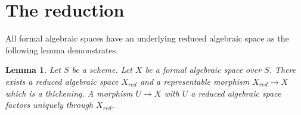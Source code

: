 \documentclass{stacks-project}
\theoremstyle{plain}
\newtheorem{lemma}[subsection]{Lemma}
\theoremstyle{definition}
\theoremstyle{remark}
\numberwithin{equation}{subsection}
\begin{document}
\section{The reduction}
\label{section-reduction}

\noindent
All formal algebraic spaces have an underlying
reduced algebraic space as the following lemma demonstrates.

\begin{lemma}
\label{lemma-reduction-formal-algebraic-space}
Let $S$ be a scheme. Let $X$ be a formal algebraic space over $S$.
There exists a reduced algebraic space $X_{red}$ and a representable
morphism $X_{red} \to X$ which is a thickening. A morphism $U \to X$
with $U$ a reduced algebraic space factors uniquely through $X_{red}$.
\end{lemma}
\end{document}
